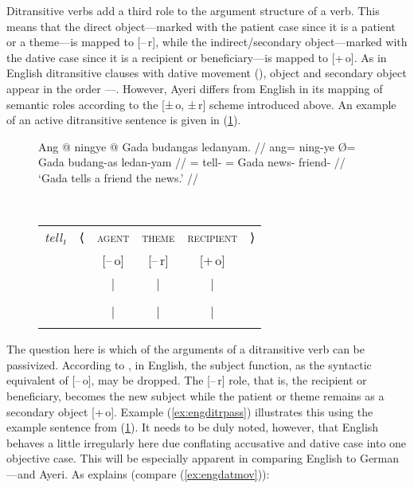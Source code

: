Ditransitive verbs add a third role to the argument structure of a verb. This
means that the direct object---marked with the patient case since it is a
patient or a theme---is mapped to [–\,r], while the indirect/secondary
object---marked with the dative case since it is a recipient or
beneficiary---is mapped to [+\,o]. As in English ditransitive clauses with
dative movement (), object and secondary object appear in
the order \Obj{}---\SObj{}. However, Ayeri differs from English in its mapping
of semantic roles according to the [±\,o, ±\,r] scheme introduced above. An
example of an active ditransitive sentence is given in (\ref{ex:ditrorder}).

\begin{figure}[h]
\ex\label{ex:ditrorder}
\begin{minipage}[t]{.4\remaining}
\begingl
	\gla Ang @ ningye {} @ Gada budangas ledanyam. //
	\glb ang= ning-ye Ø= Gada budang-as ledan-yam //
	\glc \AgtT{}= tell-\TsgF{} \Top{}= Gada news-\Parg{} friend-\Dat{} //
	\glft `Gada tells a friend the news.' //
\endgl
\end{minipage}
~
\begin{tabular}[t]{>{\itshape}l l c c c r}
tell₁
	& ⟨
	& \textsc{agent}
	& \textsc{theme}
	& \textsc{recipient}
	& ⟩
	\\
%
	& %
	& [–\,o]
	& [–\,r]
	& [+\,o]
	& %
	\\

%
	& %
	& |
	& |
	& |
	& %
	\\

%
	& %
	& \Subj*
	& \Obj
	& \SObj
	& %
	\\

%
	& %
	& |
	& |
	& |
	& %
	\\

%
	& %
	& \fw{Gada}
	& \fw{news}
	& \fw{friend}
	& %
	\\
\end{tabular}
\xe
\end{figure}

The question here is which of the arguments of a ditransitive verb can be
passivized. According to \citet{bresnan2016}, in English, the subject function,
as the syntactic equivalent of [–\,o], may be dropped. The [–\,r] role, that
is, the recipient or beneficiary, becomes the new subject while the patient or
theme remains as a secondary object [+\,o]. Example (\ref{ex:engditrpass})
illustrates this using the example sentence from (\ref{ex:ditrorder}). It needs
to be duly noted, however, that English behaves a little irregularly here due
conflating accusative and dative case into one objective case. This will be
especially apparent in comparing English to German---and Ayeri. As
\citet{kibort2007} explains (compare (\ref{ex:engdatmov})):


